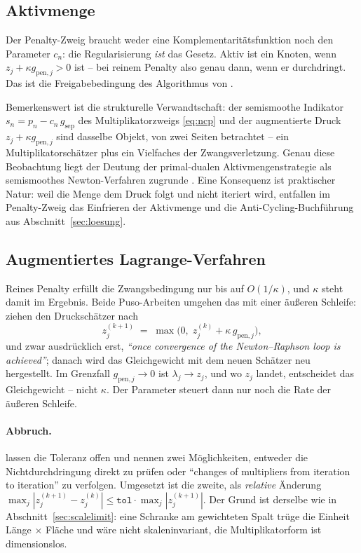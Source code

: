 \documentclass[a4paper,11pt]{article}
\begin{document}
\subsection{Aktivmenge}
\label{sec:penaltyactiveset}

Der Penalty-Zweig braucht weder eine Komplementaritätsfunktion noch den Parameter $c_n$: die
Regularisierung \emph{ist} das Gesetz. Aktiv ist ein Knoten, wenn $z_j+\kappa g_{\text{pen},j}>0$
ist -- bei reinem Penalty also genau dann, wenn er durchdringt. Das ist die Freigabebedingung des
Algorithmus von \citet[Schritt~(3)]{puso2008}.

Bemerkenswert ist die strukturelle Verwandtschaft: der semismoothe Indikator
$s_n=p_n-c_n\,g_{\text{sep}}$ des Multiplikatorzweigs \eqref{eq:ncp} und der augmentierte Druck
$z_j+\kappa g_{\text{pen},j}$ sind dasselbe Objekt, von zwei Seiten betrachtet -- ein
Multiplikatorschätzer plus ein Vielfaches der Zwangsverletzung. Genau diese Beobachtung liegt der
Deutung der primal-dualen Aktivmengenstrategie als semismoothes Newton-Verfahren zugrunde
\citep{hik2002,hueber2005}. Eine Konsequenz ist praktischer Natur: weil die Menge dem Druck folgt
und nicht iteriert wird, entfallen im Penalty-Zweig das Einfrieren der Aktivmenge und die
Anti-Cycling-Buchführung aus Abschnitt~\ref{sec:loesung}.

\subsection{Augmentiertes Lagrange-Verfahren}
\label{sec:augmented}

Reines Penalty erfüllt die Zwangsbedingung nur bis auf $O(1/\kappa)$, und $\kappa$ steht damit im
Ergebnis. Beide Puso-Arbeiten umgehen das mit einer äußeren Schleife: \citet[Gl.~(18)]{puso2008}
ziehen den Druckschätzer nach
\begin{equation}
z^{(k+1)}_j \;=\; \max\bigl(0,\;z^{(k)}_j+\kappa\,g_{\text{pen},j}\bigr),
\label{eq:uzawa}
\end{equation}
und zwar ausdrücklich erst, \emph{``once convergence of the Newton--Raphson loop is achieved''};
danach wird das Gleichgewicht mit dem neuen Schätzer neu hergestellt. Im Grenzfall
$g_{\text{pen},j}\to0$ ist $\lambda_j\to z_j$, und wo $z_j$ landet, entscheidet das Gleichgewicht
-- nicht $\kappa$. Der Parameter steuert dann nur noch die Rate der äußeren Schleife.

\paragraph{Abbruch.} \citet{puso2008} lassen die Toleranz offen und nennen zwei Möglichkeiten,
entweder die Nichtdurchdringung direkt zu prüfen oder ``changes of multipliers from iteration to
iteration'' zu verfolgen. Umgesetzt ist die zweite, als \emph{relative} Änderung
$\max_j|z^{(k+1)}_j-z^{(k)}_j|\le\texttt{tol}\cdot\max_j|z^{(k+1)}_j|$. Der Grund ist derselbe wie
in Abschnitt~\ref{sec:scalelimit}: eine Schranke am gewichteten Spalt trüge die Einheit
Länge $\times$ Fläche und wäre nicht skaleninvariant, die Multiplikatorform ist dimensionslos.
\end{document}
